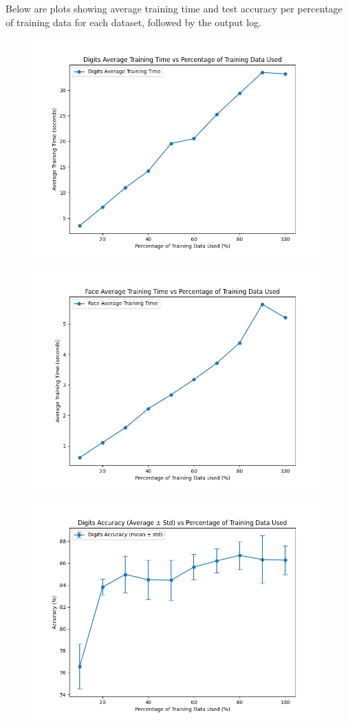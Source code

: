 \documentclass{article}
\begin{document}
\noindent Below are plots showing average training time and test accuracy per percentage of training data for each dataset, followed by the output log.
\begin{figure}[H]
    \centering
    \includegraphics[width=.75\textwidth]{report/report_figures/pytorch_digits_time.png}
\end{figure}
\begin{figure}[H]
    \centering
    \includegraphics[width=.75\textwidth]{report/report_figures/pytorch_face_time.png}
\end{figure}
\begin{figure}[H]
    \centering
    \includegraphics[width=.75\textwidth]{report/report_figures/pytorch_digits_acc.png}
\end{figure}
\end{document}
